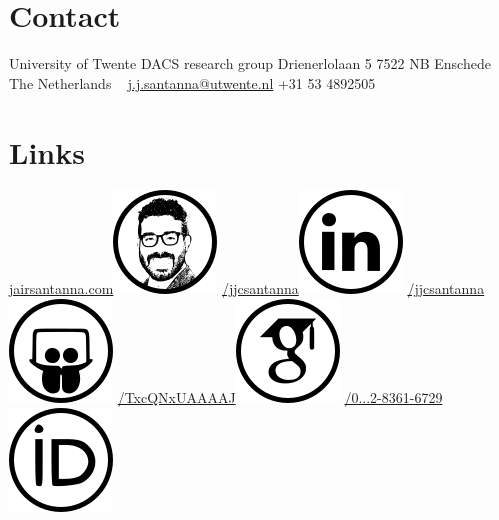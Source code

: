 \documentclass[print]{styles/friggeri-cv-mac} %
\begin{document}

\begin{aside} 
 \section{Contact}
University of Twente
DACS research group
Drienerlolaan 5 
7522 NB Enschede
The Netherlands
~
\href{mailto:j.j.santanna@utwente.nl}{j.j.santanna@utwente.nl}
+31 53 4892505
~
\section{Links}\hspace{-1cm}
\hspace{-0.5cm}\href{http://www.jairsantanna.com}{jairsantanna.com}\includegraphics[scale=0.4]{img/jairsantanna.png}
\href{https://www.linkedin.com/in/jjcsantanna}{/jjcsantanna}\includegraphics[scale=0.3]{img/linkedin.png}
\href{http://www.slideshare.net/jjcsantanna}{/jjcsantanna}\includegraphics[scale=0.3]{img/slideshare.png}
\href{https://scholar.google.com/citations?user=TxcQNxUAAAAJ}{/TxcQNxUAAAAJ}\includegraphics[scale=0.3]{img/googlescholar.png}
\href{http://orcid.org/0000-0002-8361-6729}{/0...2-8361-6729}\includegraphics[scale=0.3]{img/orcid.png}

\end{aside}
\end{document}

